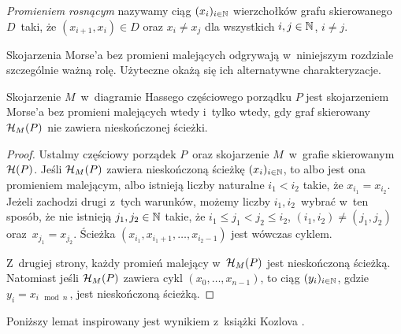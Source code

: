 \textit{Promieniem rosnącym} \cite{Ayala11} nazywamy ciąg $(x_i)_{i\in\mathbb{N}}$ wierzchołków grafu skierowanego $D$~taki, że $(x_{i+1},x_{i})\in D$ oraz $x_i\not=x_j$ dla wszystkich $i,j\in\mathbb{N}$, $i\not=j$.

Skojarzenia Morse'a bez promieni malejących odgrywają w~niniejszym rozdziale szczególnie ważną rolę. Użyteczne okażą się ich alternatywne charakteryzacje.
\begin{lem}\label{lem-niesk_sciezka_a_skojarzenie_morse}
Skojarzenie $M$~w~diagramie Hassego częściowego porządku $P$ jest skojarzeniem Morse'a bez promieni malejących wtedy i~tylko wtedy, gdy graf skierowany $\mathcal{H}_M(P)$ nie zawiera nieskończonej ścieżki.
\end{lem}
\begin{proof}
Ustalmy częściowy porządek $P$~oraz skojarzenie $M$~w~grafie skierowanym $\mathcal{H}(P)$. Jeśli $\mathcal{H}_M(P)$ zawiera nieskończoną ścieżkę $(x_i)_{i\in\mathbb{N}}$, to albo jest ona promieniem malejącym, albo istnieją liczby naturalne $i_1<i_2$ takie, że $x_{i_1}=x_{i_2}$. Jeżeli zachodzi drugi z~tych warunków, możemy liczby $i_1,i_2$~wybrać w~ten sposób, że nie istnieją $j_1,j_2\in\mathbb{N}$ takie, że $i_1\leq j_1< j_2\leq i_2$, $(i_1,i_2)\not=(j_1,j_2)$ oraz~$x_{j_1}=x_{j_2}$. Ścieżka $\left(x_{i_1},x_{i_1+1},\ldots,x_{i_2-1}\right)$ jest wówczas cyklem.

Z~drugiej strony, każdy promień malejący w~$\mathcal{H}_M(P)$ jest nieskończoną ścieżką. Natomiast jeśli $\mathcal{H}_M(P)$ zawiera cykl $\left(x_0,\ldots,x_{n-1}\right)$, to ciąg $(y_i)_{i\in\mathbb{N}}$, gdzie $y_i=x_{i\!\mod n\ }$, jest nieskończoną ścieżką.
\end{proof}

Poniższy lemat inspirowany jest wynikiem z~książki Kozlova \cite[Theorem 11.2]{Kozlov08}.

